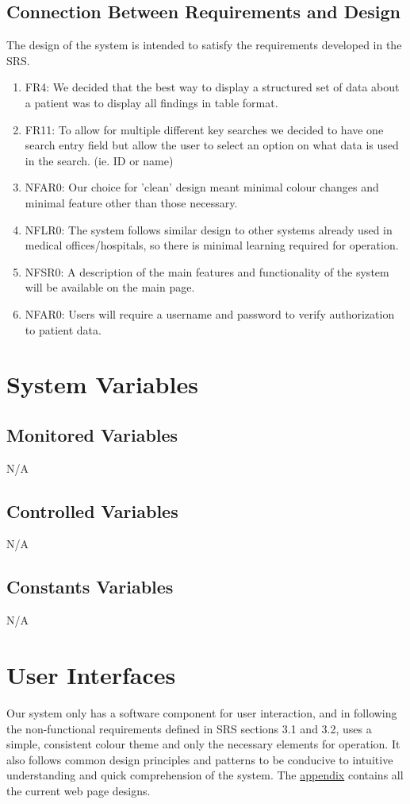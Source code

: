 \documentclass[12pt, titlepage]{article}
\begin{document}
\subsection{Connection Between Requirements and Design} \label{SecConnection}
The design of the system is intended to satisfy the requirements developed in
the SRS. 
\begin{enumerate}
    \item FR4: We decided that the best way to display a structured set of data about a patient was to display all findings in table format.
    \item FR11: To allow for multiple different key searches we decided to have one search entry field but allow the user to select an option on what data is used in the search. (ie. ID or name) 
    \item NFAR0: Our choice for 'clean' design meant minimal colour changes and minimal feature other than those necessary. 
    \item NFLR0: The system follows similar design to other systems already used in medical offices/hospitals, so there is minimal learning required for operation. 
    \item NFSR0: A description of the main features and functionality of the system will be available on the main page.
    \item NFAR0: Users will require a username and password to verify authorization to patient data. 
\end{enumerate}

\section{System Variables}
\subsection{Monitored Variables}
N/A

\subsection{Controlled Variables}
N/A

\subsection{Constants Variables}
N/A

\section{User Interfaces}
Our system only has a software component for user interaction, and in following the non-functional requirements defined in SRS sections 3.1 and 3.2, uses a simple, consistent colour theme and only the necessary elements for operation. It also follows common design principles and patterns to be conducive to intuitive understanding and quick comprehension of the system.
The \hyperlink{A}{appendix} contains all the current web page designs. 
\end{document}
